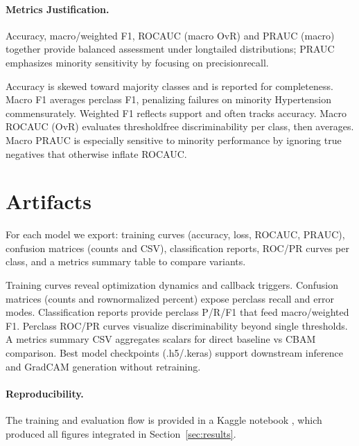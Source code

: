 \paragraph{Metrics Justification.} Accuracy, macro/weighted F1, ROC\textendash AUC (macro OvR) and PR\textendash AUC (macro) together provide balanced assessment under long\textendash tailed distributions; PR\textendash AUC emphasizes minority sensitivity by focusing on precision\textendash recall.

Accuracy is skewed toward majority classes and is reported for completeness. Macro F1 averages per\textendash class F1, penalizing failures on minority Hypertension commensurately. Weighted F1 reflects support and often tracks accuracy. Macro ROC\textendash AUC (OvR) evaluates threshold\textendash free discriminability per class, then averages. Macro PR\textendash AUC is especially sensitive to minority performance by ignoring true negatives that otherwise inflate ROC\textendash AUC.

\section{Artifacts}
For each model we export: training curves (accuracy, loss, ROC\textendash AUC, PR\textendash AUC), confusion matrices (counts and CSV), classification reports, ROC/PR curves per class, and a metrics summary table to compare variants.

Training curves reveal optimization dynamics and callback triggers. Confusion matrices (counts and row\textendash normalized percent) expose per\textendash class recall and error modes. Classification reports provide per\textendash class P/R/F1 that feed macro/weighted F1. Per\textendash class ROC/PR curves visualize discriminability beyond single thresholds. A metrics summary CSV aggregates scalars for direct baseline vs CBAM comparison. Best model checkpoints (.h5/.keras) support downstream inference and Grad\textendash CAM generation without retraining.

\paragraph{Reproducibility.} The training and evaluation flow is provided in a Kaggle notebook \cite{takrimNotebook}, which produced all figures integrated in Section~\ref{sec:results}.


